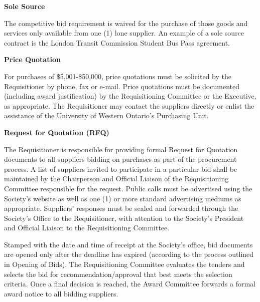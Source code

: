 \begin{longenum}[label*=\thesection.\arabic*., align=left]
\item \textbf{Sole Source}
\begin{longenum} [label*=\arabic*., align=left]
	\item The competitive bid requirement is waived for the purchase of those goods and services only available from one (1) lone supplier. An example of a sole source contract is the London Transit Commission Student Bus Pass agreement.
\end{longenum}

\item \textbf{Price Quotation}

\begin{longenum} [label*=\arabic*., align=left]
		\item For purchases of \$5,001-\$50,000, price quotations must be solicited by the Requisitioner by phone, fax or e-mail. Price quotations must be documented (including award justification) by the Requisitioning Committee or the Executive, as appropriate. The Requisitioner may contact the suppliers directly or enlist the assistance of the University of Western Ontario's Purchasing Unit.
		
\end{longenum}

\item \textbf{Request for Quotation (RFQ)}

\begin{longenum} [label*=\arabic*., align=left]
		\item  The Requisitioner is responsible for providing formal Request for Quotation documents to all suppliers bidding on purchases as part of the procurement process. A list of suppliers invited to participate in a particular bid shall be maintained by the Chairperson and Official Liaison of the Requisitioning Committee responsible for the request. Public calls must be advertised using the Society's website as well as one (1) or more standard advertising mediums as appropriate. Suppliers' responses must be sealed and forwarded through the Society's Office to the Requisitioner, with attention to the Society's President and Official Liaison to the Requisitioning Committee.
		
	\item	Stamped with the date and time of receipt at the Society's office, bid documents are opened only after the deadline has expired (according to the process outlined in Opening of Bids). The Requisitioning Committee evaluates the tenders and selects the bid for recommendation/approval that best meets the selection criteria. Once a final decision is reached, the Award Committee forwards a formal award notice to all bidding suppliers.
		

\end{longenum}
\end{longenum}
